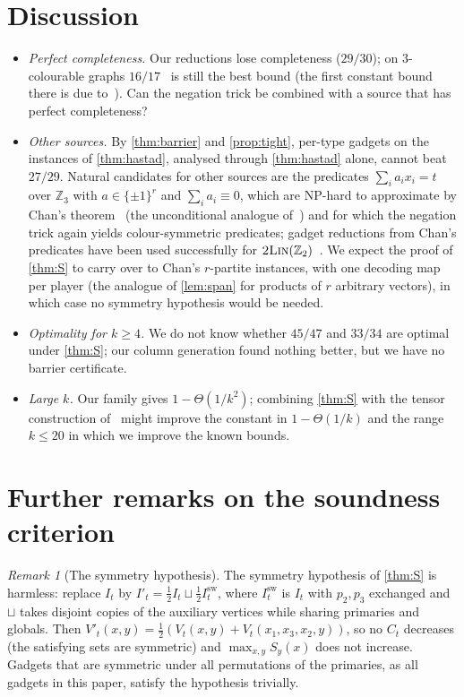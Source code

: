 \documentclass[11pt,letterpaper]{article}
\theoremstyle{remark}
\newtheorem{remark}[theorem]{Remark}
\newcommand{\Z}{\mathbb{Z}}
\begin{document}
\section{Discussion}\label{sec:discussion}

\begin{itemize}
\item \emph{Perfect completeness.} Our reductions lose completeness ($29/30$); on $3$-colourable graphs
$16/17$~\cite{AOTW14} is still the best bound (the first constant bound there is due
to~\cite{Petrank94}). Can the negation trick be combined with a source that has perfect completeness?
\item \emph{Other sources.} By \cref{thm:barrier} and \cref{prop:tight}, per-type gadgets on the
instances of \cref{thm:hastad}, analysed through \cref{thm:hastad} alone, cannot beat $27/29$. Natural
candidates for other sources are the predicates $\sum_i a_ix_i=t$ over $\Z_3$ with $a\in\{\pm1\}^r$ and
$\sum_ia_i\equiv0$, which are NP-hard to approximate by Chan's theorem~\cite{Chan16} (the unconditional
analogue of~\cite{AM09}) and for which the negation trick again yields colour-symmetric predicates; gadget
reductions from Chan's predicates have been used successfully for $\textsc{2Lin}(\Z_2)$~\cite{HHMOW17}. We
expect the proof of \cref{thm:S} to carry over to Chan's $r$-partite instances, with one decoding map per
player (the analogue of \cref{lem:span} for products of $r$ arbitrary vectors), in which case no symmetry
hypothesis would be needed.
\item \emph{Optimality for $k\ge4$.} We do not know whether $45/47$ and $33/34$ are optimal under
\cref{thm:S}; our column generation found nothing better, but we have no barrier certificate.
\item \emph{Large $k$.} Our family gives $1-\Theta(1/k^2)$; combining \cref{thm:S} with the tensor
construction of~\cite{GS13} might improve the constant in $1-\Theta(1/k)$ and the range $k\le20$ in which
we improve the known bounds.
\end{itemize}

\appendix
\section{Further remarks on the soundness criterion}\label{app:remarks}

\begin{remark}[The symmetry hypothesis]\label{rem:sym}
The symmetry hypothesis of \cref{thm:S} is harmless: replace $I_t$ by
$I'_t=\frac12I_t\sqcup\frac12I_t^{\mathrm{sw}}$, where $I_t^{\mathrm{sw}}$ is $I_t$ with $p_2,p_3$ exchanged
and $\sqcup$ takes disjoint copies of the auxiliary vertices while sharing primaries and globals. Then
$V'_t(x,y)=\frac12(V_t(x,y)+V_t(x_1,x_3,x_2,y))$, so no $C_t$ decreases (the satisfying sets are symmetric)
and $\max_{x,y}S_y(x)$ does not increase. Gadgets that are symmetric under all permutations of the
primaries, as all gadgets in this paper, satisfy the hypothesis trivially.
\end{remark}
\end{document}
